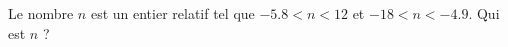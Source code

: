 
\begin{exercice}\label{exo2smath-0217}

    Le nombre \( n\) est un entier relatif tel que \( -5.8<n<12\) et \( -18<n<-4.9\). Qui est \( n\) ?

\end{exercice}
